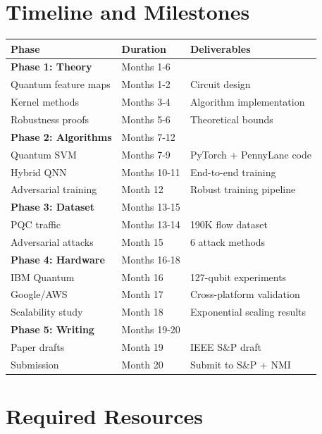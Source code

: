 \documentclass[11pt]{article}
\begin{document}
\section{Timeline and Milestones}

\begin{table}[h]
\centering
\small
\begin{tabular}{|l|l|l|}
\hline
\textbf{Phase} & \textbf{Duration} & \textbf{Deliverables} \\
\hline
\textbf{Phase 1: Theory} & Months 1-6 & \\
\quad Quantum feature maps & Months 1-2 & Circuit design \\
\quad Kernel methods & Months 3-4 & Algorithm implementation \\
\quad Robustness proofs & Months 5-6 & Theoretical bounds \\
\hline
\textbf{Phase 2: Algorithms} & Months 7-12 & \\
\quad Quantum SVM & Months 7-9 & PyTorch + PennyLane code \\
\quad Hybrid QNN & Months 10-11 & End-to-end training \\
\quad Adversarial training & Month 12 & Robust training pipeline \\
\hline
\textbf{Phase 3: Dataset} & Months 13-15 & \\
\quad PQC traffic & Months 13-14 & 190K flow dataset \\
\quad Adversarial attacks & Month 15 & 6 attack methods \\
\hline
\textbf{Phase 4: Hardware} & Months 16-18 & \\
\quad IBM Quantum & Month 16 & 127-qubit experiments \\
\quad Google/AWS & Month 17 & Cross-platform validation \\
\quad Scalability study & Month 18 & Exponential scaling results \\
\hline
\textbf{Phase 5: Writing} & Months 19-20 & \\
\quad Paper drafts & Month 19 & IEEE S\&P draft \\
\quad Submission & Month 20 & Submit to S\&P + NMI \\
\hline
\end{tabular}
\end{table}

\section{Required Resources}
\end{document}
